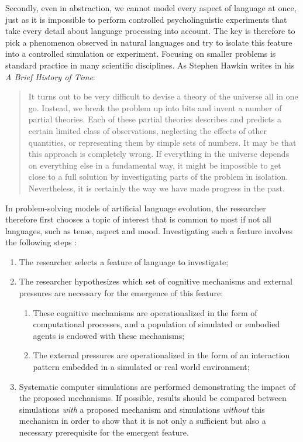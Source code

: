 Secondly, even in abstraction, we cannot model every aspect of language at once, just as it is impossible to perform controlled psycholinguistic experiments that take every detail about language processing into account. The key is therefore to pick a phenomenon observed in natural languages and try to isolate this feature into a controlled simulation or experiment. Focusing on smaller problems is standard practice in many scientific disciplines. As Stephen Hawkin writes in his {\em A Brief History of Time}:

\begin{quote}
It turns out to be very difficult to devise a theory of the universe all in one go. Instead, we break the problem up into bits and invent a number of partial theories. Each of these partial theories describes and predicts a certain limited class of observations, neglecting the effects of other quantities, or representing them by simple sets of numbers. It may be that this approach is completely wrong. If everything in the universe depends on everything else in a fundamental way, it might be impossible to get close to a full solution by investigating parts of the problem in isolation. Nevertheless, it is certainly the way we have made progress in the past. 
\\ \cite[12]{hawkin88brief}
\end{quote}

In problem-solving models of artificial language evolution, the researcher therefore first chooses a topic of interest that is common to most if not all languages, such as tense, aspect and mood. Investigating such a feature involves the following steps \citep{steels06how}:

\begin{enumerate}
\item The researcher selects a feature of language to investigate;
\item The researcher hypothesizes which set of cognitive mechanisms and external pressures are necessary for the emergence of this feature:
\begin{enumerate}
\item These cognitive mechanisms are operationalized in the form of computational processes, and a population of simulated or embodied agents is endowed with these mechanisms;
\item The external pressures are operationalized in the form of an interaction pattern embedded in a simulated or real world environment;
\end{enumerate}
\item Systematic computer simulations are performed demonstrating the impact of the proposed mechanisms. If possible, results should be compared between simulations {\em with} a proposed mechanism and simulations {\em without} this mechanism in order to show that it is not only a sufficient but also a necessary prerequisite for the emergent feature. 
\end{enumerate}

